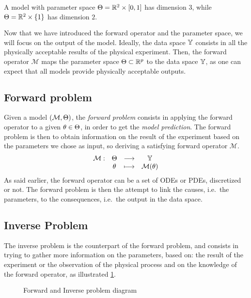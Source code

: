 \documentclass[../../Main_ManuscritThese.tex]{subfiles}
\newcommand\imgpath{/home/victor/acadwriting/Manuscrit/Text/Chapter2/img/}
\begin{document}
\begin{example}
  A model with parameter space $\Kspace = \mathbb{R}^2\times \interval{0}{1}$ has dimension $3$, while $\Theta = \mathbb{R}^2 \times \{1\}$ has dimension $2$.
\end{example}
Now that we have introduced the forward operator and the parameter
space, we will focus on the output of the model.  Ideally, the data
space $\mathbb{Y}$ consists in all the physically acceptable results of
the physical experiment.  Then, the forward operator $\mathcal{M}$
maps the parameter space $\Theta \subset \mathbb{R}^{p}$ to the data
space $\mathbb{Y}$, as one can expect that all models provide physically
acceptable outputs.

\subsection{Forward problem}
Given a model $(\mathcal{M}, \Theta)$, the \emph{forward problem}
consists in applying the forward operator to a given
$\theta \in \Theta$, in order to get the \emph{model prediction}. The
forward problem is then to obtain information on the result of the
experiment based on the parameters we chose as input, so deriving a
satisfying forward operator $\mathcal{M}$.
\begin{equation}
  \begin{array}{cccc}
    \mathcal{M}:& \Theta &\longrightarrow & \mathbb{Y} \\
                & \theta &\longmapsto     & \mathcal{M}(\theta)
  \end{array}
\end{equation}
As said earlier, the forward operator can be a set of ODEs or PDEs,
discretized or not. The forward problem is then the attempt to link
the causes, i.e.\ the parameters, to the consequences, i.e.\ the
output in the data space.

\subsection{Inverse Problem}
The inverse problem is the counterpart of the forward problem, and
consists in trying to gather more information on the parameters, based
on: the result of the experiment or the observation of the physical
process and on the knowledge of the forward operator, as illustrated
\cref{fig:inv_problem_pple}.

\begin{figure}[ht]
  \centering
  
  \caption{Forward and Inverse problem diagram}
  \label{fig:inv_problem_pple}
\end{figure}
\end{document}
